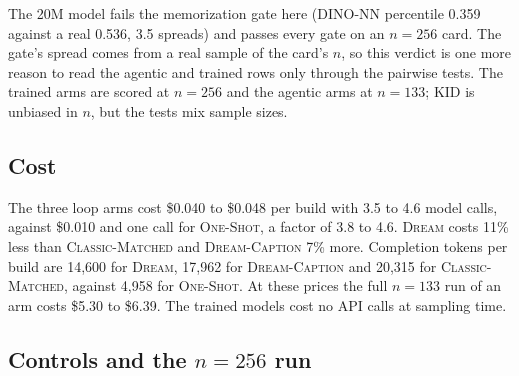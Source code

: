 The 20M model fails the memorization gate here (DINO-NN percentile 0.359 against a real 0.536, 3.5 spreads) and passes every gate on an $n{=}256$ card. %
The gate's spread comes from a real sample of the card's $n$, so this verdict is one more reason to read the agentic and trained rows only through the pairwise tests. %
The trained arms are scored at $n{=}256$ and the agentic arms at $n{=}133$; KID is unbiased in $n$, but the tests mix sample sizes. %

\subsection{Cost}

The three loop arms cost \$0.040 to \$0.048 per build with 3.5 to 4.6 model calls, against \$0.010 and one call for \textsc{One-Shot}, a factor of 3.8 to 4.6. %
\textsc{Dream} costs 11\% less than \textsc{Classic-Matched} and \textsc{Dream-Caption} 7\% more. %
Completion tokens per build are 14{,}600 for \textsc{Dream}, 17{,}962 for \textsc{Dream-Caption} and 20{,}315 for \textsc{Classic-Matched}, against 4{,}958 for \textsc{One-Shot}. %
At these prices the full $n{=}133$ run of an arm costs \$5.30 to \$6.39. %
The trained models cost no API calls at sampling time. 

\subsection{Controls and the $n{=}256$ run}

